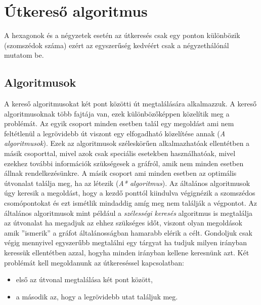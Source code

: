 \chapter{Útkereső algoritmus}

A hexagonok és a négyzetek esetén az útkeresés csak egy ponton különbözik (szomszédok száma) ezért az egyszerűség kedvéért csak a négyzethálónál mutatom be.

\section{Algoritmusok}

A kereső algoritmusokat két pont közötti út megtalálására alkalmazzuk. 
A kereső algoritmusoknak több fajtája van, ezek különbözőképpen közelítik meg a problémát. 
\newline
\newline Az egyik csoport minden esetben talál egy megoldást ami nem feltétlenül a legrövidebb út viszont egy elfogadható közelítése annak (\textit{A algoritmusok}). Ezek az algoritmusok széleskörűen alkalmazhatóak ellentétben a másik csoporttal, mivel azok csak speciális esetekben használhatóak, mivel ezekhez további információk szükségesek a gráfról, amik nem minden esetben állnak rendelkezésünkre.
\newline A másik csoport ami minden esetben az optimális útvonalat találja meg, ha az létezik (\textit{A* algoritmus}).
\newline
\newline Az általános algoritmusok úgy keresik a megoldást, hogy a kezdő ponttól kiindulva végignézik a szomszédos csomópontokat és ezt ismétlik mindaddig amíg meg nem találják a végpontot. Az általános algoritmusok mint például a \textit{szélességi keresés} algoritmus is megtalálja az útvonalat ha megadjuk az ehhez szükséges időt, viszont olyan megoldások amik ''ismerik'' a gráfot általánosságban hamarabb elérik a célt. Gondoljuk csak végig mennyivel egyszerűbb megtalálni egy tárgyat ha tudjuk milyen irányban keressük ellentétben azzal, hogyha minden irányban kellene keresnünk azt.
\newline
\newline Két problémát kell megoldanunk az útkereséssel kapcsolatban: 
\begin{itemize}
\item első az útvonal megtalálása két pont között, 
\item a második az, hogy a legrövidebb utat találjuk meg. 
\end{itemize}

